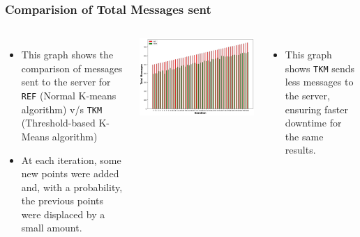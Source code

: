 \documentclass{beamer}
\begin{document}
\begin{frame}
  \frametitle{Comparision of Total Messages sent}

  \begin{columns}

    \begin{itemize}
      \item This graph shows the comparison of messages sent to the server for \texttt{REF} (Normal K-means algorithm) v/s \texttt{TKM} (Threshold-based K-Means algorithm)
      \item At each iteration, some new points were added and, with a probability, the previous points were displaced by a small amount.


    \end{itemize}

    \includegraphics[width=1\textwidth]{msg.png}
    \begin{itemize}
      \vspace{-0.2cm}
      \item \small This graph shows \texttt{TKM} sends less messages to the server, ensuring faster downtime for the same results.
    \end{itemize}
  \end{columns}
\end{frame}
\end{document}
